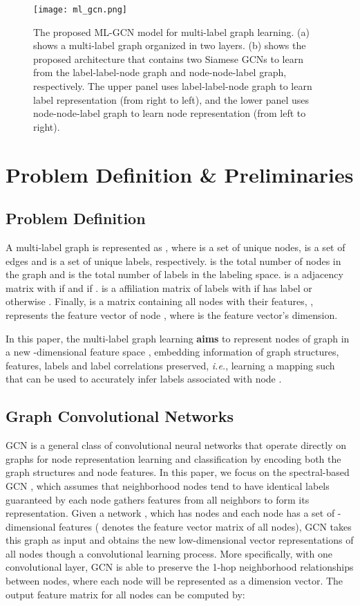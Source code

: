 \documentclass[conference]{IEEEtran}
\begin{document}
\begin{figure*}
  \centering
    \texttt{[image: ml\_gcn.png]}
  \caption{The proposed ML-GCN model for multi-label graph learning. (a) shows a multi-label graph organized in two layers. (b) shows the proposed architecture that contains two Siamese GCNs to learn from the label-label-node graph and node-node-label graph, respectively. The upper panel uses label-label-node graph to learn label representation (from right to left), and the lower panel uses node-node-label graph to learn node representation (from left to right).}
  \label{fig:mlgcn}
\end{figure*}

\section{Problem Definition \& Preliminaries}
\subsection{Problem Definition}
A multi-label graph is represented as , where  is a set of unique nodes,  is a set of edges and  is a set of unique labels, respectively.  is the total number of nodes in the graph and  is the total number of labels in the labeling space.  is a  adjacency matrix with  if  and  if .  is a  affiliation matrix of labels with  if  has label  or otherwise . Finally,  is a matrix containing all  nodes with their features, ,  represents the feature vector of node , where  is the feature vector's dimension. 

In this paper, the multi-label graph learning \textbf{aims} to represent nodes of graph  in a new -dimensional feature space , embedding information of graph structures, features, labels and label correlations preserved, \textit{i.e.}, learning a mapping  such that  can be used to accurately infer labels associated with node . 

\subsection{Graph Convolutional Networks}
GCN \cite{wu2019comprehensive} is a general class of convolutional neural networks that operate directly on graphs for node representation learning and classification by encoding both the graph structures and node features. In this paper, we focus on the spectral-based GCN \cite{15}, which assumes that neighborhood nodes tend to have identical labels guaranteed by each node gathers features from all neighbors to form its representation. Given a network , which has  nodes and each node has a set of -dimensional features ( denotes the feature vector matrix of all nodes), GCN takes this graph as input and obtains the new low-dimensional vector representations of all nodes though a convolutional learning process. More specifically, with one convolutional layer, GCN is able to preserve the 1-hop neighborhood relationships between nodes, where each node will be represented as a dimension vector. The output feature matrix for all nodes  can be computed by:
\end{document}
